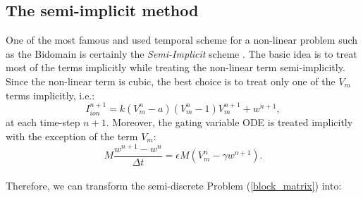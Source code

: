 \documentclass[a4paper,11pt]{article}
\begin{document}
\subsection{The semi-implicit method}
One of the most famous and used temporal scheme for a non-linear problem such as the Bidomain is certainly the \emph{Semi-Implicit} scheme \cite{acta}. The basic idea is to treat most of the terms implicitly while treating the non-linear term semi-implicitly. Since the non-linear term is cubic, the best choice is to treat only one of the $V_m$ terms implicitly, i.e.:
\begin{equation*}
I_{ion}^{n+1}=k(V_m^n-a)(V_m^n-1)V_m^{n+1}+w^{n+1},
\end{equation*}
at each time-step $n+1$. 
Moreover, the gating variable ODE is treated implicitly with the exception of the term $V_m$:
\begin{equation*}
M \frac{w^{n+1}-w^n}{\Delta t}=\epsilon M (V_m^n-\gamma w^{n+1}).
\end{equation*}
\vspace{5mm} \\
Therefore, we can transform the semi-discrete Problem (\ref{block_matrix}) into:
\end{document}
